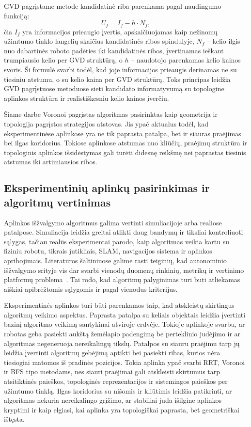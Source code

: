 \documentclass[]{VUMIFTemplateClass}
\begin{document}
GVD pagrįstame metode kandidatinė riba parenkama pagal naudingumo funkciją:
\begin{equation}
    U_f = I_f - h \cdot N_f,
    \label{eq:gvd-utility}
\end{equation}
čia $I_f$ yra informacijos prieaugio įvertis, apskaičiuojamas kaip nežinomų užimtumo tinklo langelių skaičius kandidatinės ribos spindulyje, $N_f$ -- kelio
ilgis nuo dabartinės roboto padėties iki kandidatinės ribos, įvertinamas ieškant trumpiausio kelio per GVD struktūrą, o $h$ -- naudotojo parenkamas kelio
kainos svoris. Ši formulė svarbi todėl, kad joje informacijos
prieaugis derinamas ne su tiesiniu atstumu, o su kelio kaina per GVD struktūrą. Toks principas leidžia GVD pagrįstuose metoduose sieti
kandidato informatyvumą su topologine aplinkos struktūra ir realistiškesniu kelio kainos įverčiu.

Šiame darbe Voronoi pagrįstas algoritmas pasirinktas kaip geometrija ir topologija pagrįstos strategijos atstovas. Jis ypač aktualus todėl, kad eksperimentinėse
aplinkose yra ne tik paprasta patalpa, bet ir siauras praėjimas bei ilgas koridorius. Tokiose aplinkose atstumas nuo kliūčių, praėjimų struktūra ir topologinis
aplinkos išsidėstymas gali turėti didesnę reikšmę nei paprastas tiesinis atstumas iki artimiausios ribos.

\subsection{Eksperimentinių aplinkų pasirinkimas ir algoritmų vertinimas}

Aplinkos išžvalgymo algoritmus galima vertinti simuliacijoje arba realiose patalpose. Simuliacija leidžia greitai atlikti daug bandymų ir tiksliai kontroliuoti
sąlygas, tačiau realūs eksperimentai parodo, kaip algoritmas veikia kartu su fiziniu robotu, tikrais jutikliais, SLAM, navigacijos sistema ir aplinkos
apribojimais. Literatūros šaltiniuose galime rasti teiginių, kad autonominio išžvalgymo srityje vis dar svarbi vienodų duomenų rinkinių, metrikų ir vertinimo platformų
problema~\cite{xu2022explorebench}. Tai rodo, kad algoritmų palyginimas turi būti atliekamas aiškiai apibrėžtomis sąlygomis ir pagal vienodus kriterijus.

Eksperimentinės aplinkos turi būti parenkamos taip, kad atskleistų skirtingus algoritmų veikimo aspektus. Paprasta patalpa su keliais objektais leidžia
įvertinti bazinį algoritmo veikimą santykinai atviroje erdvėje. Tokioje aplinkoje svarbu, ar robotas geba pasiekti aukštą žemėlapio padengimą be perteklinio
judėjimo ir ar algoritmas negeneruoja nereikalingų tikslų. Patalpos su siauru praėjimu tarp jų leidžia įvertinti algoritmų gebėjimą aptikti bei
pasiekti ribas, kurios nėra tiesiogiai matomos iš pradinės pozicijos. Tokia aplinka ypač svarbi RRT, Voronoi ir BFS tipo metodams, nes siauri praėjimai gali
atskleisti skirtumus tarp atsitiktinės paieškos, topologinės reprezentacijos ir sistemingos paieškos per užimtumo tinklą. Ilgas koridorius su nišomis ir
kliūtimis leidžia patikrinti, ar algoritmas nekuria nereikalingo grįžimo, ar stabiliai juda išilgine aplinkos kryptimi ir kaip elgiasi, kai aplinka yra
topologiškai paprasta, bet geometriškai ištęsta.
\end{document}
